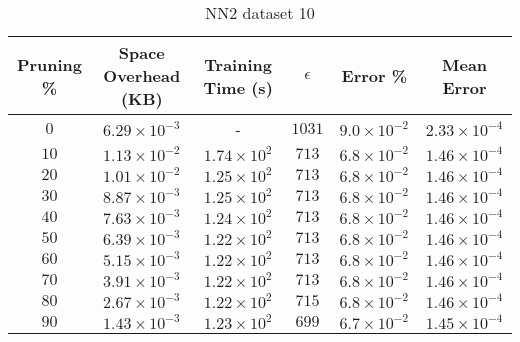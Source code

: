 \begin{adjustwidth}{0cm}{}
\begin{table}
\caption{NN2 dataset 10}\label{pr210}
\begin{tabular}{cccccc}
\hline
\toprule
Pruning \% & Space Overhead (KB) & Training Time (s) & $\epsilon$ & Error \% & Mean Error\\
\midrule
$0$ & $6.29 \times 10^{-3}$ & - & $1031$ & $9.0 \times 10^{-2}$ & $2.33 \times 10^{-4}$\\
$10$ & $1.13 \times 10^{-2}$ & $1.74 \times 10^{2}$ & $713$ & $6.8 \times 10^{-2}$ & $1.46 \times 10^{-4}$\\
$20$ & $1.01 \times 10^{-2}$ & $1.25 \times 10^{2}$ & $713$ & $6.8 \times 10^{-2}$ & $1.46 \times 10^{-4}$\\
$30$ & $8.87 \times 10^{-3}$ & $1.25 \times 10^{2}$ & $713$ & $6.8 \times 10^{-2}$ & $1.46 \times 10^{-4}$\\
$40$ & $7.63 \times 10^{-3}$ & $1.24 \times 10^{2}$ & $713$ & $6.8 \times 10^{-2}$ & $1.46 \times 10^{-4}$\\
$50$ & $6.39 \times 10^{-3}$ & $1.22 \times 10^{2}$ & $713$ & $6.8 \times 10^{-2}$ & $1.46 \times 10^{-4}$\\
$60$ & $5.15 \times 10^{-3}$ & $1.22 \times 10^{2}$ & $713$ & $6.8 \times 10^{-2}$ & $1.46 \times 10^{-4}$\\
$70$ & $3.91 \times 10^{-3}$ & $1.22 \times 10^{2}$ & $713$ & $6.8 \times 10^{-2}$ & $1.46 \times 10^{-4}$\\
$80$ & $2.67 \times 10^{-3}$ & $1.22 \times 10^{2}$ & $715$ & $6.8 \times 10^{-2}$ & $1.46 \times 10^{-4}$\\
$90$ & $1.43 \times 10^{-3}$ & $1.23 \times 10^{2}$ & $699$ & $6.7 \times 10^{-2}$ & $1.45 \times 10^{-4}$\\
\bottomrule
\end{tabular}
\end{table}
\end{adjustwidth}

